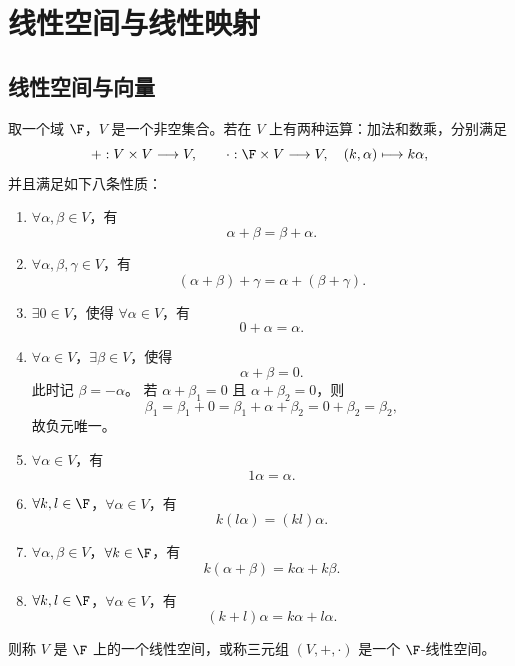 \setchapterintro{}
\chapter{线性空间与线性映射}
\section{线性空间与向量}

\begin{definition}[线性空间]
	取一个域 $\F$，$V$ 是一个非空集合。若在 $V$ 上有两种运算：加法和数乘，分别满足
	\[
	+ : V\times V\longrightarrow V,
	\qquad
	\cdot : \F\times V\longrightarrow V,
	\quad (k,\alpha)\longmapsto k\alpha,
	\]
	并且满足如下八条性质：
	\begin{enumerate}
		\item $\forall \alpha,\beta\in V$，有
		\[
		\alpha+\beta=\beta+\alpha .
		\]
		\item $\forall \alpha,\beta,\gamma\in V$，有
		\[
		(\alpha+\beta)+\gamma=\alpha+(\beta+\gamma) .
		\]
		\item $\exists 0\in V$，使得 $\forall \alpha\in V$，有
		\[
		0+\alpha=\alpha .
		\]
		\item $\forall \alpha\in V$，$\exists \beta\in V$，使得
		\[
		\alpha+\beta=0 .
		\]
		此时记 $\beta=-\alpha$。
		若 $\alpha+\beta_1=0$ 且 $\alpha+\beta_2=0$，则
		\[
		\beta_1=\beta_1+0
		=\beta_1+\alpha+\beta_2
		=0+\beta_2=\beta_2,
		\]
		故负元唯一。
		\item $\forall \alpha\in V$，有
		\[
		1\alpha=\alpha .
		\]
		\item $\forall k,l\in\F$，$\forall \alpha\in V$，有
		\[
		k(l\alpha)=(kl)\alpha .
		\]
		\item $\forall \alpha,\beta\in V$，$\forall k\in\F$，有
		\[
		k(\alpha+\beta)=k\alpha+k\beta .
		\]
		\item $\forall k,l\in\F$，$\forall \alpha\in V$，有
		\[
		(k+l)\alpha=k\alpha+l\alpha .
		\]
	\end{enumerate}
	则称 $V$ 是 $\F$ 上的一个线性空间，或称三元组 $(V,+,\cdot)$ 是一个 $\F$-线性空间。
\end{definition}

